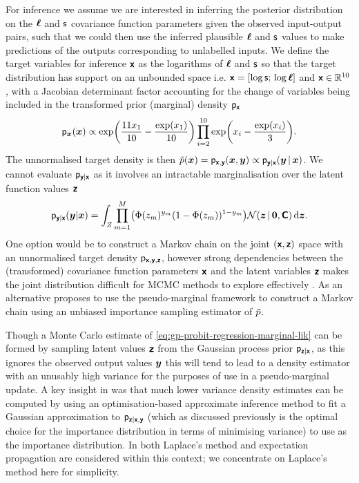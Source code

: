 For inference we assume we are interested in inferring the posterior distribution on the $\boldsymbol{\mathsf{\ell}}$ and $\mathsf{s}$ covariance function parameters given the observed input-output pairs, such that we could then use the inferred plausible $\boldsymbol{\mathsf{\ell}}$ and $\mathsf{s}$ values to make predictions of the outputs corresponding to unlabelled inputs. We define the target variables for inference $\boldsymbol{\mathsf{x}}$ as the logarithms of $\boldsymbol{\mathsf{\ell}}$ and $\mathsf{s}$ so that the target distribution has support on an unbounded space i.e. $\boldsymbol{\mathsf{x}} = [\log\mathsf{s};\,\log\boldsymbol{\mathsf{\ell}}]$ and $\boldsymbol{\mathsf{x}} \in \mathbb{R}^{10}$, with a Jacobian determinant factor accounting for the change of variables being included in the transformed prior (marginal) density $\mathsf{p}_{\boldsymbol{\mathsf{x}}}$
\begin{equation}\label{eq:gp-model-target-prior}
  \pden{\vct{x}}(\vct{x}) \propto 
  \exp\lpa\frac{11 x_1}{10} -\frac{\exp(x_1)}{10}\rpa \prod_{i=2}^{10} \exp\lpa x_i -\frac{\exp(x_i)}{3}\rpa.
\end{equation}
The unnormalised target density is then $\tilde{p}(\boldsymbol{x}) = \mathsf{p}_{\boldsymbol{\mathsf{x}},\boldsymbol{\mathsf{y}}}(\boldsymbol{x},\boldsymbol{y}) \propto \mathsf{p}_{\boldsymbol{\mathsf{y}}|\boldsymbol{\mathsf{x}}}(\boldsymbol{y}\operatorname{|}\boldsymbol{x})$. We cannot evaluate $\mathsf{p}_{\boldsymbol{\mathsf{y}}|\boldsymbol{\mathsf{x}}}$ as it involves an intractable marginalisation over the latent function values $\boldsymbol{\mathsf{z}}$
\begin{equation}\label{eq:gp-probit-regression-marginal-lik}
\begin{split}
  \pden{\rvct{y}|\rvct{x}}(\vct{y}|\vct{x}) =
  \int_{\set{Z}} 
    \prod_{m=1}^M\lpa \Phi(z_m)^{y_m} (1 - \Phi(z_m))^{1-y_m} \rpa
    \nrm{\vct{z} \gvn \vct{0}, \rvct{C}}
  \,\dr\vct{z}.
\end{split}
\end{equation}
One option would be to construct a Markov chain on the joint $(\boldsymbol{\mathsf{x}},\boldsymbol{\mathsf{z}})$ space with an unnormalised target density $\mathsf{p}_{\boldsymbol{\mathsf{x}},\boldsymbol{\mathsf{y}},\boldsymbol{\mathsf{z}}}$, however strong dependencies between the (transformed) covariance function parameters $\boldsymbol{\mathsf{x}}$ and the latent variables $\boldsymbol{\mathsf{z}}$ makes the joint distribution difficult for \ac{MCMC} methods to explore effectively \citep{filippone2014pseudo}. As an alternative \citep{filippone2014pseudo} proposes to use the pseudo-marginal framework to construct a Markov chain using an unbiased importance sampling estimator of $\tilde{p}$.

Though a Monte Carlo estimate of \eqref{eq:gp-probit-regression-marginal-lik} can be formed by sampling latent values $\boldsymbol{\mathsf{z}}$ from the Gaussian process prior $\mathsf{p}_{\boldsymbol{\mathsf{z}}|\boldsymbol{\mathsf{x}}}$, as this ignores the observed output values $\boldsymbol{y}$ this will tend to lead to a density estimator with an unusably high variance for the purposes of use in a pseudo-marginal update. A key insight in \citep{filippone2014pseudo} was that much lower variance density estimates can be computed by using an optimisation-based approximate inference method to fit a Gaussian approximation to $\mathsf{p}_{\boldsymbol{\mathsf{z}}|\boldsymbol{\mathsf{x}},\boldsymbol{\mathsf{y}}}$ (which as discussed previously is the optimal choice for the importance distribution in terms of minimising variance) to use as the importance distribution. In \citep{filippone2014pseudo} both Laplace's method and expectation propagation are considered within this context; we concentrate on Laplace's method here for simplicity.

